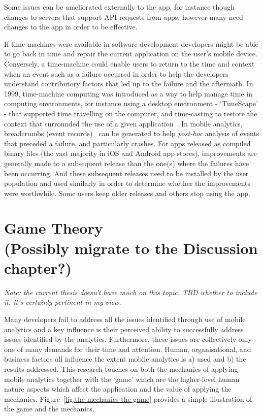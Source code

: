 Some issues can be ameliorated externally to the app, for instance though changes to servers that support API requests from apps, however many need changes to the app in order to be effective. 

If time-machines were available in software development developers might be able to go back in time and repair the current application on the user's mobile device. Conversely, a time-machine could enable users to return to the time and context when an event such as a failure occurred in order to help the developers understand contributory factors that led up to the failure and the aftermath. In 1999, time-machine computing was introduced as a way to help manage time in computing environments, for instance using a desktop environment - `TimeScape' - that supported time travelling on the computer, and time-casting to restore the context that surrounded the use of a given application~\citep{rekimoto1999_time_machine_computing}. In mobile analytics, breadcrumbs (event records)~\citep[p.683]{MacLean2015_pro_android_5_book} can be generated to help \emph{post-hoc} analysis of events that preceded a failure, and particularly crashes. 
%
For apps released as compiled binary files (the vast majority in iOS and Android app stores), improvements are generally made to a subsequent release than the one(s) where the failures have been occurring. And these subsequent releases need to be installed by the user population and used similarly in order to determine whether the improvements were worthwhile. Some users keep older releases and others stop using the app. 



\clearpage
\section[Game Theory]{Game Theory\\ \small{(Possibly migrate to the Discussion chapter?)}}

\emph{Note: the current thesis doesn't have much on this topic. TBD whether to include it, it's certainly pertinent in my view.}

Many developers fail to address all the issues identified through use of mobile analytics and a key influence is their perceived ability to successfully address issues identified by the analytics. Furthermore, these issues are collectively only one of many demands for their time and attention. Human, organisational, and business factors all influence the extent mobile analytics is a) used and b) the results addressed. This research touches on both the mechanics of applying mobile analytics together with the `game' which are the higher-level human nature aspects which affect the application and the value of applying the mechanics. Figure~\ref{fig:the-mechanics-the-game} provides a simple illustration of the game and the mechanics.

